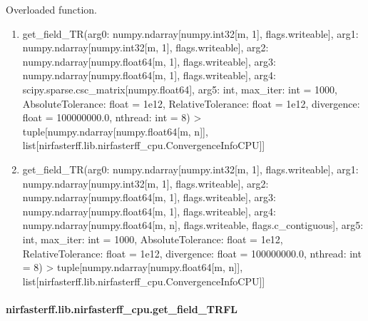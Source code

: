 \documentclass[letterpaper,10pt,english]{sphinxmanual}
\begin{document}
\begin{fulllineitems}
\label{\detokenize{_autosummary/nirfasterff.lib.nirfasterff_cpu.get_field_TR:nirfasterff.lib.nirfasterff_cpu.get_field_TR}}
\pysigstartsignatures
\pysiglinewithargsret
{}
{\sphinxparamcomma {}}
{}
\pysigstopsignatures
\sphinxAtStartPar
Overloaded function.
\begin{enumerate}
%
\item {} 
\sphinxAtStartPar
get\_field\_TR(arg0: numpy.ndarray{[}numpy.int32{[}m, 1{]}, flags.writeable{]}, arg1: numpy.ndarray{[}numpy.int32{[}m, 1{]}, flags.writeable{]}, arg2: numpy.ndarray{[}numpy.float64{[}m, 1{]}, flags.writeable{]}, arg3: numpy.ndarray{[}numpy.float64{[}m, 1{]}, flags.writeable{]}, arg4: scipy.sparse.csc\_matrix{[}numpy.float64{]}, arg5: int, max\_iter: int = 1000, AbsoluteTolerance: float = 1e\sphinxhyphen{}12, RelativeTolerance: float = 1e\sphinxhyphen{}12, divergence: float = 100000000.0, nthread: int = 8) \sphinxhyphen{}\textgreater{} tuple{[}numpy.ndarray{[}numpy.float64{[}m, n{]}{]}, list{[}nirfasterff.lib.nirfasterff\_cpu.ConvergenceInfoCPU{]}{]}

\item {} 
\sphinxAtStartPar
get\_field\_TR(arg0: numpy.ndarray{[}numpy.int32{[}m, 1{]}, flags.writeable{]}, arg1: numpy.ndarray{[}numpy.int32{[}m, 1{]}, flags.writeable{]}, arg2: numpy.ndarray{[}numpy.float64{[}m, 1{]}, flags.writeable{]}, arg3: numpy.ndarray{[}numpy.float64{[}m, 1{]}, flags.writeable{]}, arg4: numpy.ndarray{[}numpy.float64{[}m, n{]}, flags.writeable, flags.c\_contiguous{]}, arg5: int, max\_iter: int = 1000, AbsoluteTolerance: float = 1e\sphinxhyphen{}12, RelativeTolerance: float = 1e\sphinxhyphen{}12, divergence: float = 100000000.0, nthread: int = 8) \sphinxhyphen{}\textgreater{} tuple{[}numpy.ndarray{[}numpy.float64{[}m, n{]}{]}, list{[}nirfasterff.lib.nirfasterff\_cpu.ConvergenceInfoCPU{]}{]}

\end{enumerate}

\end{fulllineitems}


\sphinxstepscope


\paragraph{nirfasterff.lib.nirfasterff\_cpu.get\_field\_TRFL}
\label{\detokenize{_autosummary/nirfasterff.lib.nirfasterff_cpu.get_field_TRFL:nirfasterff-lib-nirfasterff-cpu-get-field-trfl}}\label{\detokenize{_autosummary/nirfasterff.lib.nirfasterff_cpu.get_field_TRFL::doc}}
\end{document}
